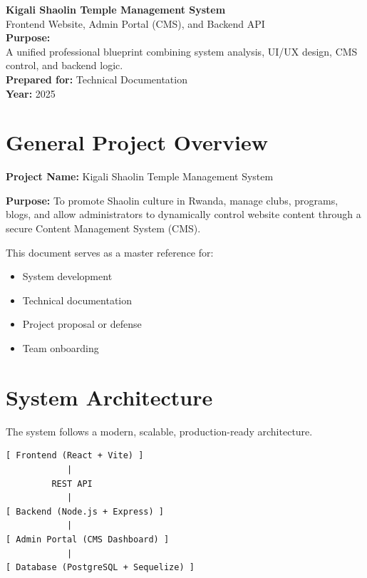 \documentclass[12pt,a4paper]{article}
\begin{document}
\begin{titlepage}
    \centering
    \vspace*{2cm}
    {\Huge \textbf{Kigali Shaolin Temple Management System}}\\[0.5cm]
    {\Large Frontend Website, Admin Portal (CMS), and Backend API}\\[2cm]
    
    \textbf{Purpose:}\\
    A unified professional blueprint combining system analysis, UI/UX design,
    CMS control, and backend logic.\\[1.5cm]
    
    \vfill
    {\large \textbf{Prepared for:} Technical Documentation}\\
    {\large \textbf{Year:} 2025}
\end{titlepage}

\tableofcontents
\newpage

\section{General Project Overview}

\textbf{Project Name:} Kigali Shaolin Temple Management System

\textbf{Purpose:}  
To promote Shaolin culture in Rwanda, manage clubs, programs, blogs, and allow administrators
to dynamically control website content through a secure Content Management System (CMS).

This document serves as a master reference for:
\begin{itemize}
    \item System development
    \item Technical documentation
    \item Project proposal or defense
    \item Team onboarding
\end{itemize}

\section{System Architecture}

The system follows a modern, scalable, production-ready architecture.

\begin{verbatim}
[ Frontend (React + Vite) ]
            |
         REST API
            |
[ Backend (Node.js + Express) ]
            |
[ Admin Portal (CMS Dashboard) ]
            |
[ Database (PostgreSQL + Sequelize) ]
\end{verbatim}
\end{document}
